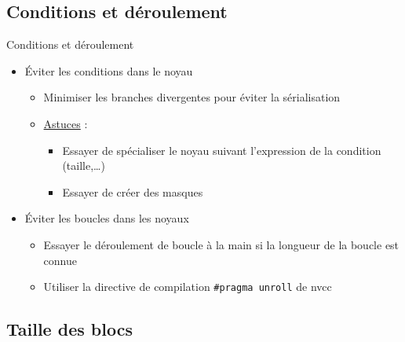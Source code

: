 \documentclass{beamer}
\begin{document}
\subsection{Conditions et déroulement}

\begin{frame}{Conditions et déroulement}

  \begin{itemize}
  \item \'Eviter les conditions dans le noyau
    \begin{itemize}
    \item Minimiser les branches divergentes pour éviter la sérialisation
    \item \underline{Astuces} :
      \begin{itemize}
      \item Essayer de spécialiser le noyau suivant l'expression de la condition
        (taille,\ldots)
      \item Essayer de créer des masques
      \end{itemize}
    \end{itemize}
  \item  \'Eviter les boucles dans les noyaux
    \begin{itemize}
    \item Essayer le déroulement de boucle à la main si la longueur de la boucle est connue
    \item Utiliser la directive de compilation \texttt{\#pragma unroll} de nvcc
    \end{itemize}
\end{itemize}
\end{frame}

\subsection{Taille des blocs}
\end{document}
